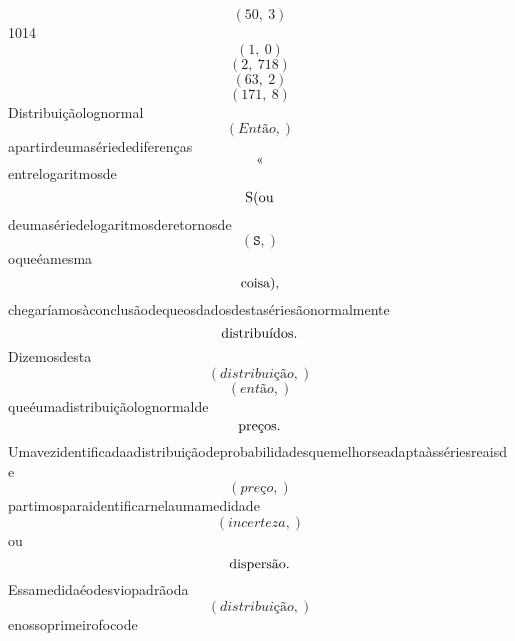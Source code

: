 \documentclass{article}
\begin{document}
\begin{equation}
\left( 50, \  3\right)
\end{equation}1014\begin{equation}
\left( 1, \  0\right)
\end{equation}\begin{equation}
\left( 2, \  718\right)
\end{equation}\begin{equation}
\left( 63, \  2\right)
\end{equation}\begin{equation}
\left( 171, \  8\right)
\end{equation}Distribuiçãolognormal\begin{equation}
\left( Então,\right)
\end{equation}apartirdeumasériedediferenças\begin{equation}
«
\end{equation}entrelogaritmosde\begin{equation}
$S(ou$
\end{equation}deumasériedelogaritmosderetornosde\begin{equation}
\left( \mathtt{\text{S}},\right)
\end{equation}oqueéamesma\begin{equation}
$coisa),$
\end{equation}chegaríamosàconclusãodequeosdadosdestasériesãonormalmente\begin{equation}
$distribuídos.$
\end{equation}Dizemosdesta\begin{equation}
\left( distribuição,\right)
\end{equation}\begin{equation}
\left( então,\right)
\end{equation}queéumadistribuiçãolognormalde\begin{equation}
$preços.$
\end{equation}Umavezidentificadaadistribuiçãodeprobabilidadesquemelhorseadaptaàssériesreaisde\begin{equation}
\left( preço,\right)
\end{equation}partimosparaidentificarnelaumamedidade\begin{equation}
\left( incerteza,\right)
\end{equation}ou\begin{equation}
$dispersão.$
\end{equation}Essamedidaéodesviopadrãoda\begin{equation}
\left( distribuição,\right)
\end{equation}enossoprimeirofocode\begin{equation}

\end{equation}
\end{document}
